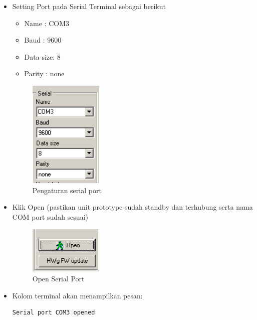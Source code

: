 \documentclass{article}
\begin{document}
\begin{enumerate}
\begin{itemize}
			\item Setting Port pada Serial Terminal sebagai berikut
			\begin{itemize}
				\item Name     : COM3
				\item Baud     : 9600
				\item Data size: 8
				\item Parity   : none
			\end{itemize}
			
			\begin{figure}[H]
				\centering
				\includegraphics[width=100pt]{images/software/hercules_port}
				\caption{Pengaturan serial port}
			\end{figure}
			
			\item Klik Open (pastikan unit prototype sudah standby dan terhubung
			serta nama COM port sudah sesuai)
			
			\begin{figure}[H]
				\centering
				\includegraphics[width=100pt]{images/software/hercules_open}
				\caption{Open Serial Port}
			\end{figure}
			
			\item Kolom terminal akan menampilkan pesan:
			\begin{verbatim}
Serial port COM3 opened
			\end{verbatim}
			

\end{itemize}
\end{enumerate}
\end{document}
